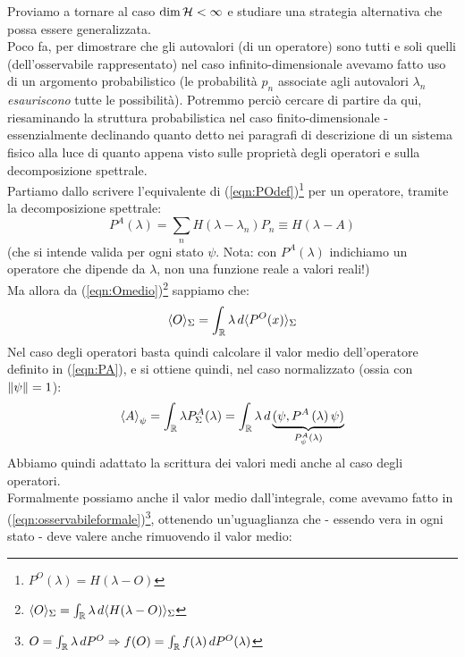 \documentclass[../../FisicaTeorica.tex]{subfiles}
\begin{document}
Proviamo a tornare al caso $\operatorname{dim}\mathcal{H} < \infty$ e studiare una strategia alternativa che possa essere generalizzata.\\
Poco fa, per dimostrare che gli autovalori  (di un operatore) sono tutti e soli quelli  (dell'osservabile rappresentato) nel caso infinito-dimensionale avevamo fatto uso di un argomento probabilistico (le probabilità $p_n$ associate agli autovalori $\lambda_n$ \textit{esauriscono} tutte le possibilità). Potremmo perciò cercare di partire da qui, riesaminando la struttura probabilistica nel caso finito-dimensionale - essenzialmente declinando quanto detto nei paragrafi di descrizione di un sistema fisico %
alla luce di quanto appena visto sulle proprietà degli operatori e sulla decomposizione spettrale.\\
Partiamo dallo scrivere l'equivalente di (\ref{eqn:POdef})\footnote{$P^O(\lambda) = H(\lambda-O)$} per un operatore, tramite la decomposizione spettrale: %
\begin{equation} 
P^A\left(\lambda\right)=\sum_{n}{H\left(\lambda-\lambda_n\right)P_n}\equiv H(\lambda-A) 
\label{eqn:PA}
\end{equation}
(che si intende valida per ogni stato $\psi$. Nota: con $P^A(\lambda)$ indichiamo un operatore che dipende da $\lambda$, non una funzione reale a valori reali!)\\
Ma allora da (\ref{eqn:Omedio})\footnote{$\langle O \rangle_\Sigma = \int_{\mathbb{R}} \lambda\, d\langle H(\lambda-O)\rangle_\Sigma$} sappiamo che: %
\[
\langle O \rangle_\Sigma = \int_{\mathbb{R}} \lambda\, d\langle P^O(x)\rangle_\Sigma 
\]
Nel caso degli operatori basta quindi calcolare il valor medio dell'operatore definito in (\ref{eqn:PA}), e si ottiene quindi, nel caso normalizzato (ossia con $\left\lVert\psi\right\rVert = 1$):
\begin{equation}
\left\langle A\right\rangle_\psi= \int_{\mathbb{R}} \lambda P^A_\Sigma(\lambda) =\int_{\mathbb{R}}{\lambda\, d \underbrace{(\psi,P^A\left(\lambda\right)\psi)}_{P_\psi^A(\lambda)}}
\label{eqn:valormedioA}
\end{equation}
Abbiamo quindi adattato la scrittura  dei valori medi anche al caso degli operatori.\\
Formalmente possiamo anche  il valor medio dall'integrale, come avevamo fatto in (\ref{eqn:osservabileformale})\footnote{$O = \int_{\mathbb{R}} \lambda\, dP^O \Rightarrow f(O) = \int_{\mathbb{R}} f(\lambda)\, dP^O(\lambda)$}, ottenendo un'uguaglianza che - essendo vera in ogni stato - deve valere anche rimuovendo il valor medio: %
\end{document}
